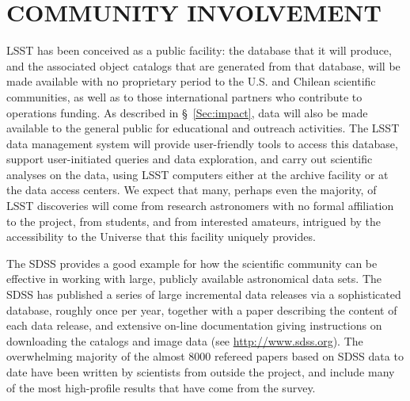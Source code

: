 \section{  COMMUNITY INVOLVEMENT   }
\label{Sec:community}

LSST has been conceived as a public facility: the database that it will
produce, and the associated object catalogs that are generated from that
database, will be made available with no proprietary period to the
U.S. and Chilean scientific communities, as well as to those
international partners who contribute to operations funding.  As
described in \S~\ref{Sec:impact}, data will also be made available to
the general public for educational and outreach activities.
The LSST data management
system will provide user-friendly tools to access this database, support
user-initiated queries and data exploration, and carry out scientific analyses on the
data, using LSST computers either at the archive facility
or at the data access centers.
We expect that many, perhaps even the majority,
of LSST discoveries will come from research astronomers with no formal
affiliation to the project, from students, and from interested amateurs,
intrigued by the accessibility to the Universe that this facility uniquely
provides.

The SDSS provides a good example for how the scientific
community can be effective in working with large, publicly available
astronomical data sets. The SDSS has published a series of large incremental
data releases via a sophisticated database, roughly once per year, together with
a paper describing the content of each data release, and extensive on-line
documentation giving instructions on downloading the catalogs and image data
(see \url{http://www.sdss.org}). The overwhelming majority of the almost
8000 refereed papers based
on SDSS data to date have been written by scientists from outside
the project, and  include many of the most high-profile results that have come
from the survey.

